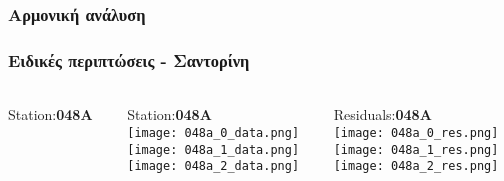 \begin{frame}
  \frametitle{Αρμονική ανάλυση}
  \framesubtitle{}
  \label{}

\end{frame}
\note{}

\begin{frame}
  \frametitle{Ειδικές περιπτώσεις - Σαντορίνη}
  \framesubtitle{}
  \label{}
  \vskip-1cm
  \begin{columns}[T]
    \begin{column}{.33\textwidth}
      \begin{center}
      Station:\textbf{048A}\\
       \end{center} 
    \end{column}
    \begin{column}{.33\textwidth}
      \begin{center}
      Station:\textbf{048A}\\
         \texttt{[image: 048a\_0\_data.png]}\\
         \texttt{[image: 048a\_1\_data.png]}\\
         \texttt{[image: 048a\_2\_data.png]}
       \end{center} 
    \end{column}
    \begin{column}{.33\textwidth}
      \begin{center}
      Residuals:\textbf{048A}\\
         \texttt{[image: 048a\_0\_res.png]}\\
         \texttt{[image: 048a\_1\_res.png]}\\
         \texttt{[image: 048a\_2\_res.png]}
       \end{center} 
      
    \end{column}
  \end{columns}
\end{frame}
\note{}


